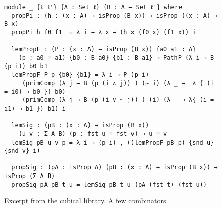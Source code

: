 %
\begin{figure}[h]
\begin{Verbatim}
module _ {ℓ ℓ'} {A : Set ℓ} {B : A → Set ℓ'} where
  propPi : (h : (x : A) → isProp (B x)) → isProp ((x : A) → B x)
  propPi h f0 f1  = λ i → λ x → (h x (f0 x) (f1 x)) i

  lemPropF : (P : (x : A) → isProp (B x)) {a0 a1 : A}
    (p : a0 ≡ a1) {b0 : B a0} {b1 : B a1} → PathP (λ i → B (p i)) b0 b1
  lemPropF P p {b0} {b1} = λ i → P (p i)
     (primComp (λ j → B (p (i ∧ j)) ) (~ i) (λ _ →  λ { (i = i0) → b0 }) b0)
     (primComp (λ j → B (p (i ∨ ~ j)) ) (i) (λ _ → λ{ (i = i1) → b1 }) b1) i

  lemSig : (pB : (x : A) → isProp (B x))
    (u v : Σ A B) (p : fst u ≡ fst v) → u ≡ v
  lemSig pB u v p = λ i → (p i) , ((lemPropF pB p) {snd u} {snd v} i)

  propSig : (pA : isProp A) (pB : (x : A) → isProp (B x)) → isProp (Σ A B)
  propSig pA pB t u = lemSig pB t u (pA (fst t) (fst u))
\end{Verbatim}
\caption{Excerpt from the cubical library. A few combinators.}
\end{figure}
\clearpage
